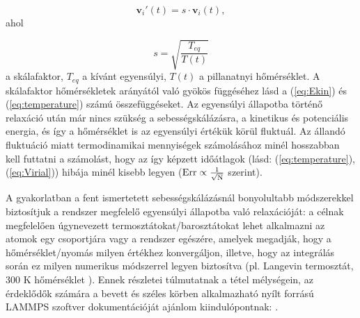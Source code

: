 \documentclass[12pt]{article}
\theoremstyle{plain}
\begin{document}
\begin{equation}
	\mathbf{v}_i'(t) = s \cdot \mathbf{v}_i(t),
\end{equation}
ahol

\begin{equation}
	s = \sqrt{\frac{T_{eq}}{T(t)}}
\end{equation}
a skálafaktor, $T_{eq}$ a kívánt egyensúlyi, $T(t)$ a pillanatnyi hőmérséklet. A skálafaktor hőmérsékletek arányától való gyökös függéséhez lásd a (\ref{eq:Ekin}) és (\ref{eq:temperature}) számú összefüggéseket. Az egyensúlyi állapotba történő relaxáció után már nincs szükség a sebességskálázásra, a kinetikus és potenciális energia, és így a hőmérséklet is az egyensúlyi értékük körül fluktuál. Az állandó fluktuáció miatt termodinamikai mennyiségek számolásához minél hosszabban kell futtatni a számolást, hogy az így képzett időátlagok (lásd: (\ref{eq:temperature}), (\ref{eq:Virial})) hibája minél kisebb legyen ($\rm{Err} \propto \frac{1}{\sqrt{N}}$ szerint).

A gyakorlatban a fent ismertetett sebességskálázásnál bonyolultabb módszerekkel biztosítjuk a rendszer megfelelő egyensúlyi állapotba való relaxációját: a célnak megfelelően úgynevezett termosztátokat/barosztátokat lehet alkalmazni az atomok egy csoportjára vagy a rendszer egészére, amelyek megadják, hogy a hőmérséklet/nyomás milyen értékhez konvergáljon, illetve, hogy az integrálás során ez milyen numerikus módszerrel legyen biztosítva (pl. Langevin termosztát, 300 K hőmérséklet \cite{LAMMPS_fix_langevin}). Ennek részletei túlmutatnak a tétel mélységein, az érdeklődők számára a bevett és széles körben alkalmazható nyílt forrású LAMMPS szoftver dokumentációját ajánlom kiindulópontnak: \cite{LAMMPS_howto_thermostat, LAMMPS_howto_barostat}.





%
%

\end{document}
